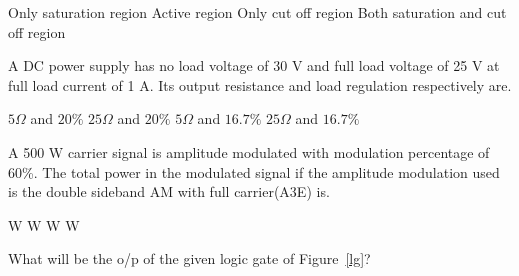 \documentclass[a4, 12pt, addpoints]{exam}
\begin{document}
\begin{questions}
\begin{oneparchoices}
\choice Only saturation region
\choice Active region
\choice Only cut off region
\choice Both saturation and cut off region
\end{oneparchoices}  
\question A DC power supply has no load voltage of 30 V and full load voltage of 25 V at full load current of 1 A. Its output resistance and load regulation respectively are. \\[0.3cm]
\begin{oneparchoices}
\choice $5 \Omega$ and $20 \%$ 
\choice $25 \Omega$ and $20 \%$
\choice $5 \Omega$ and $ 16.7 \%$
\choice $25 \Omega$ and $16.7 \%$
\end{oneparchoices} 
\question A 500 W carrier signal is amplitude modulated with modulation percentage of 60\%.  The total power in the modulated signal if the amplitude modulation used is  the double sideband AM with full carrier(A3E) is. \\[0.3cm]
 \begin{oneparchoices}
 W
 W
 W
 W
\end{oneparchoices} 
\question What will be the o/p of the given logic gate of Figure~\ref{lg}?
\begin{figure}[H]
\centering
{}
\end{figure}
\end{questions}
\end{document}
